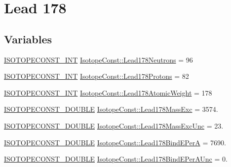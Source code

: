 \hypertarget{group___isotope_const-_lead-_pb178}{}\section{Lead 178}
\label{group___isotope_const-_lead-_pb178}
\subsection*{Variables}
\begin{DoxyCompactItemize}
\item 
\mbox{\hyperlink{group___isotope_const-_macros_ga5f18360b3e99483a35c32d789e62621c}{I\+S\+O\+T\+O\+P\+E\+C\+O\+N\+S\+T\+\_\+\+I\+NT}} \mbox{\hyperlink{group___isotope_const-_lead-_pb178_ga61b0082a129d2f847bdd4b86cb64b6d3}{Isotope\+Const\+::\+Lead178\+Neutrons}} = 96
\item 
\mbox{\hyperlink{group___isotope_const-_macros_ga5f18360b3e99483a35c32d789e62621c}{I\+S\+O\+T\+O\+P\+E\+C\+O\+N\+S\+T\+\_\+\+I\+NT}} \mbox{\hyperlink{group___isotope_const-_lead-_pb178_gab84aa832988a28f59dd8ff51b493452c}{Isotope\+Const\+::\+Lead178\+Protons}} = 82
\item 
\mbox{\hyperlink{group___isotope_const-_macros_ga5f18360b3e99483a35c32d789e62621c}{I\+S\+O\+T\+O\+P\+E\+C\+O\+N\+S\+T\+\_\+\+I\+NT}} \mbox{\hyperlink{group___isotope_const-_lead-_pb178_ga676182395a638fa4092cf0a086d2f566}{Isotope\+Const\+::\+Lead178\+Atomic\+Weight}} = 178
\item 
\mbox{\hyperlink{group___isotope_const-_macros_ga8f45a7272ce02c0b4c65c44636ed719a}{I\+S\+O\+T\+O\+P\+E\+C\+O\+N\+S\+T\+\_\+\+D\+O\+U\+B\+LE}} \mbox{\hyperlink{group___isotope_const-_lead-_pb178_gae158b44d4fe34e535a03e9eeeb17c43a}{Isotope\+Const\+::\+Lead178\+Mass\+Exc}} = 3574.
\item 
\mbox{\hyperlink{group___isotope_const-_macros_ga8f45a7272ce02c0b4c65c44636ed719a}{I\+S\+O\+T\+O\+P\+E\+C\+O\+N\+S\+T\+\_\+\+D\+O\+U\+B\+LE}} \mbox{\hyperlink{group___isotope_const-_lead-_pb178_ga8a899c2119fa4b39fa1612c14a54a9dd}{Isotope\+Const\+::\+Lead178\+Mass\+Exc\+Unc}} = 23.
\item 
\mbox{\hyperlink{group___isotope_const-_macros_ga8f45a7272ce02c0b4c65c44636ed719a}{I\+S\+O\+T\+O\+P\+E\+C\+O\+N\+S\+T\+\_\+\+D\+O\+U\+B\+LE}} \mbox{\hyperlink{group___isotope_const-_lead-_pb178_gae9ec61159dfb725523f1d60d28de7f63}{Isotope\+Const\+::\+Lead178\+Bind\+E\+PerA}} = 7690.
\item 
\mbox{\hyperlink{group___isotope_const-_macros_ga8f45a7272ce02c0b4c65c44636ed719a}{I\+S\+O\+T\+O\+P\+E\+C\+O\+N\+S\+T\+\_\+\+D\+O\+U\+B\+LE}} \mbox{\hyperlink{group___isotope_const-_lead-_pb178_gaae1e49277f22c275d017406ca87f1f18}{Isotope\+Const\+::\+Lead178\+Bind\+E\+Per\+A\+Unc}} = 0.

\end{DoxyCompactItemize}
